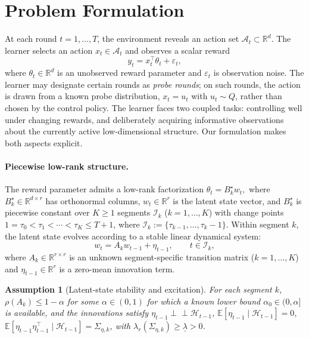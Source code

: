 \documentclass{article}
\newcommand{\R}{\mathbb{R}}
\newcommand{\E}{\mathbb{E}}
\newcommand{\cA}{\mathcal{A}}
\newcommand{\cH}{\mathcal{H}}
\newcommand{\cI}{\mathcal{I}}
\newtheorem{assumption}{Assumption}
\begin{document}



\section{Problem Formulation}
\label{sec:formulation}

At each round $t = 1, \ldots, T$, the environment reveals an action set $\cA_t \subset \R^d$.
The learner selects an action $x_t \in \cA_t$ and observes a scalar reward
\begin{equation}
  y_t = x_t^\top \theta_t + \varepsilon_t,
  \label{eq:reward}
\end{equation}
where $\theta_t \in \R^d$ is an unobserved reward parameter and $\varepsilon_t$ is observation noise.
The learner may designate certain rounds as \emph{probe rounds}; on such rounds, the action is drawn from a known probe distribution, $x_t = u_t$ with $u_t \sim Q$, rather than chosen by the control policy. The learner faces two coupled tasks: controlling well under changing rewards, and deliberately acquiring informative observations about the currently active low-dimensional structure.
Our formulation makes both aspects explicit.

\paragraph{Piecewise low-rank structure.} The reward parameter admits a low-rank factorization $\theta_t = B_k^\star w_t,$ where $B_k^\star \in \R^{d \times r}$ has orthonormal columns, $w_t \in \R^r$ is the latent state vector, and $B_k^\star$ is piecewise constant over $K \ge 1$ segments $\cI_k$ ($k = 1, \ldots, K$) with change points $1 = \tau_0 < \tau_1 < \cdots < \tau_K \le T+1$, where $\cI_k := \{\tau_{k-1}, \ldots, \tau_k - 1\}$.
Within segment $k$, the latent state evolves according to a stable linear dynamical system:
\begin{equation}
  w_t = A_k w_{t-1} + \eta_{t-1}, \qquad t \in \cI_k,
  \label{eq:lds}
\end{equation}
where $A_k \in \R^{r \times r}$ is an unknown segment-specific transition matrix ($k = 1, \ldots, K$) and $\eta_{t-1} \in \R^r$ is a zero-mean innovation term.

\begin{assumption}[Latent-state stability and excitation]
\label{assum:latent_dynamics}
For each segment $k$, $\rho(A_k)\le 1-\alpha$ for some $\alpha\in(0,1)$ for which a known lower bound $\alpha_0\in(0,\alpha]$ is available, and the innovations satisfy
$\eta_{t-1}\perp\!\!\!\perp \cH_{t-1}$,
$\E[\eta_{t-1}\mid \cH_{t-1}] = 0$,
$\E[\eta_{t-1}\eta_{t-1}^\top \mid \cH_{t-1}] = \Sigma_{\eta,k}$,
with $\lambda_r(\Sigma_{\eta,k}) \ge \underline{\lambda} > 0$.
\end{assumption}
\end{document}

